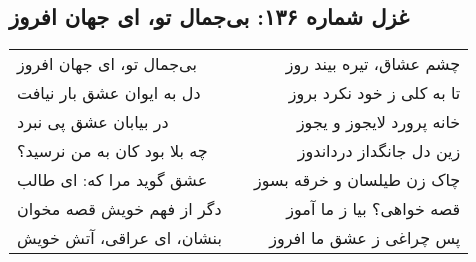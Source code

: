 \begin{center}
\section*{غزل شماره ۱۳۶: بی‌جمال تو، ای جهان افروز}
\label{sec:136}
\begin{longtable}{l p{0.5cm} r}
بی‌جمال تو، ای جهان افروز
&&
چشم عشاق، تیره بیند روز
\\
دل به ایوان عشق بار نیافت
&&
تا به کلی ز خود نکرد بروز
\\
در بیابان عشق پی نبرد
&&
خانه پرورد لایجوز و یجوز
\\
چه بلا بود کان به من نرسید؟
&&
زین دل جانگداز درداندوز
\\
عشق گوید مرا که: ای طالب
&&
چاک زن طیلسان و خرقه بسوز
\\
دگر از فهم خویش قصه مخوان
&&
قصه خواهی؟ بیا ز ما آموز
\\
بنشان، ای عراقی، آتش خویش
&&
پس چراغی ز عشق ما افروز
\\
\end{longtable}
\end{center}
